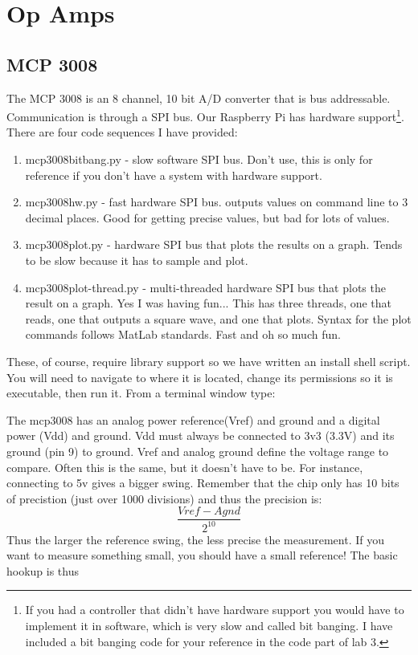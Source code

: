 \chapter{Op Amps}

\section{MCP 3008}

The MCP 3008 is an 8 channel, 10 bit A/D converter that is bus addressable.  Communication is through a SPI bus.  Our Raspberry Pi has hardware support\footnote{If you had a controller that didn't have hardware support you would have to implement it in software, which is very slow and called bit banging.  I have included a bit banging code for your reference in the code part of lab 3.}.  There are four code sequences I have provided:
\begin{enumerate}
\item mcp3008bitbang.py - slow software SPI bus.  Don't use, this is only for reference if you don't have a system with hardware support.
\item mcp3008hw.py - fast hardware SPI bus.  outputs values on command line to 3 decimal places.  Good for getting precise values, but bad for lots of values.
\item mcp3008plot.py - hardware SPI bus that plots the results on a graph.  Tends to be slow because it has to sample and plot.
\item mcp3008plot-thread.py - multi-threaded hardware SPI bus that plots the result on a graph.  Yes I was having fun...  This has three threads, one that reads, one that outputs a square wave, and one that plots.  Syntax for the plot commands follows MatLab standards.  Fast and oh so much fun.
\end{enumerate}
These, of course, require library support so we have written an install shell script.  You will need to navigate to where it is located, change its permissions so it is executable, then run it.  From a terminal window type:




The mcp3008 has an analog power reference(Vref) and ground and a digital power (Vdd) and ground.  Vdd must always be connected to 3v3 (3.3V) and its ground (pin 9) to ground.  Vref and analog ground define the voltage range to compare.  Often this is the same, but it doesn't have to be.  For instance, connecting to 5v gives a bigger swing.  Remember that the chip only has 10 bits of precistion (just over 1000 divisions) and thus the precision is:
$$
\frac{Vref-Agnd}{2^{10}}
$$
Thus the larger the reference swing, the less precise the measurement.  If you want to measure something small, you should have a small reference!  The basic hookup is thus

